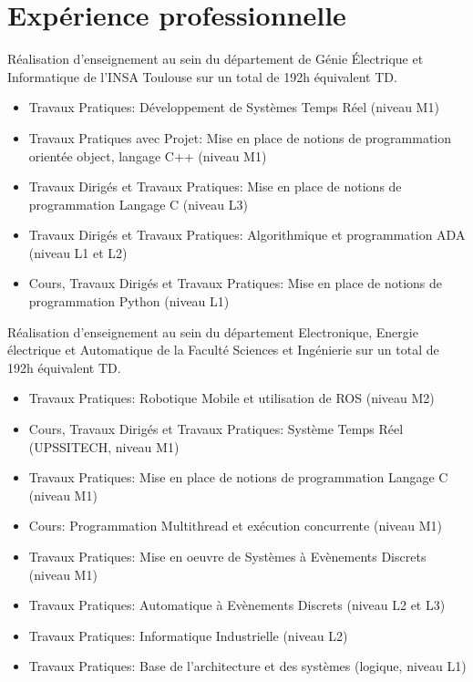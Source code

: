 \documentclass[11pt,a4paper,sans]{moderncv}         %
\begin{document}
\section{Exp\'erience professionnelle}
{
R\'ealisation d'enseignement au sein du d\'epartement de G\'enie \'Electrique et Informatique de l'INSA Toulouse sur un total de 192h \'equivalent TD.
\begin{itemize}
  \item Travaux Pratiques: D\'eveloppement de Syst\`emes Temps R\'eel (niveau M1)
  \item Travaux Pratiques avec Projet: Mise en place de notions de programmation orient\'ee object, langage C++ (niveau M1)
  \item Travaux Dirig\'es et Travaux Pratiques: Mise en place de notions de programmation Langage C (niveau L3)
  \item Travaux Dirig\'es et Travaux Pratiques: Algorithmique et programmation ADA (niveau L1 et L2)
  \item Cours, Travaux Dirig\'es et Travaux Pratiques: Mise en place de notions de programmation Python (niveau L1)
\end{itemize}
}
{
R\'ealisation d'enseignement au sein du d\'epartement Electronique, Energie \'electrique et Automatique de la Facult\'e Sciences et Ing\'enierie sur un total de 192h \'equivalent TD.
\begin{itemize}
  \item Travaux Pratiques: Robotique Mobile et utilisation de ROS (niveau M2)
  \item Cours, Travaux Dirig\'es et Travaux Pratiques: Syst\`eme Temps R\'eel (UPSSITECH, niveau M1)
  \item Travaux Pratiques: Mise en place de notions de programmation Langage C (niveau M1)
  \item Cours: Programmation Multithread et ex\'ecution concurrente (niveau M1)
  \item Travaux Pratiques: Mise en oeuvre de Syst\`emes \`a Ev\`enements Discrets (niveau M1)
  \item Travaux Pratiques: Automatique \`a Ev\`enements Discrets (niveau L2 et L3)
  \item Travaux Pratiques: Informatique Industrielle (niveau L2)
  \item Travaux Pratiques: Base de l'architecture et des syst\`emes (logique, niveau L1)
\end{itemize}
}
\end{document}
